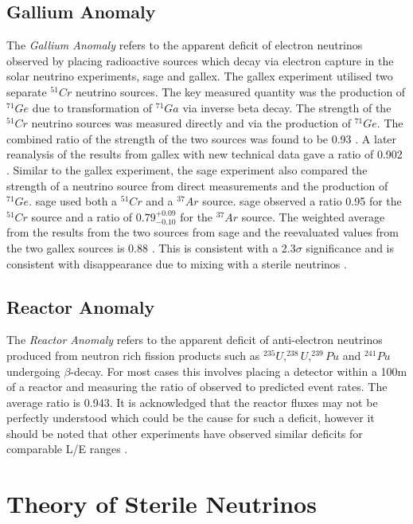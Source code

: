 \subsection{Gallium Anomaly}
The \textit{Gallium Anomaly} refers to the apparent deficit of electron neutrinos observed by placing radioactive sources which decay via electron capture in the solar neutrino experiments, \gls{sage} and \gls{gallex}. The \gls{gallex} experiment utilised two separate $^{51}Cr$ neutrino sources. The key measured quantity was the production of $^{71}Ge$ due to transformation of $^{71}Ga$ via inverse beta decay. The strength of the $^{51}Cr$ neutrino sources was measured directly and via the production of $^{71}Ge$. The combined ratio of the strength of the two sources was found to be 0.93 \cite{GALLEX}. A later reanalysis of the results from \gls{gallex} with new technical data gave a ratio of 0.902 \cite{Gallex_reanalysis}. Similar to the \gls{gallex} experiment, the \gls{sage} experiment also compared the strength of a neutrino source from direct measurements and the production of $^{71}Ge$. \gls{sage} used both a $^{51}Cr$ and a $^{37}Ar$ source.  \gls{sage} observed a ratio 0.95 for the $^{51}Cr$ source and a ratio of $0.79^{+0.09}_{-0.10}$ for the $^{37}Ar$ source. The weighted average from the results from the two sources from \gls{sage} and the reevaluated values from the two \gls{gallex} sources is 0.88 \cite{SAGE}. This is consistent with a 2.3$\sigma$ significance and is consistent with \nuebar disappearance due to mixing with a sterile neutrinos \cite{gallium_anomaly}.

\subsection{Reactor Anomaly}
The \textit{Reactor Anomaly} refers to the apparent deficit of anti-electron neutrinos produced from neutron rich fission products such as $^{235}U, ^{238}U, ^{239}Pu$ and $^{241}Pu$ undergoing  $\beta$-decay. For most cases this involves placing a detector within a 100m of a reactor and measuring the ratio of observed to predicted event rates. The average ratio is 0.943. It is acknowledged that the reactor fluxes may not be perfectly understood which could be the cause for such a deficit, however it should be noted that other experiments have observed similar deficits for comparable L/E ranges \cite{Reactor_anomaly}. 

\section{Theory of Sterile Neutrinos}\label{subchap:Theory of Sterile Neutrinos}

